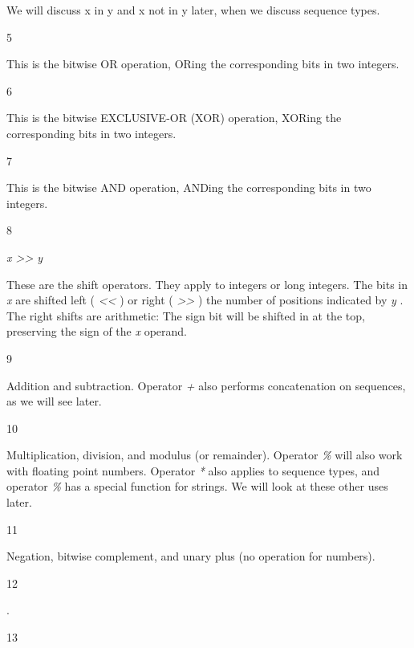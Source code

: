 We will discuss x in y and x not
in y later, when we discuss sequence types.

5



This is the bitwise OR operation,
ORing the corresponding bits in two integers.

6



This is the bitwise EXCLUSIVE-OR
(XOR) operation, XORing the corresponding bits in two integers.

7



This is the bitwise AND operation,
ANDing the corresponding bits in two integers.

8



 \emph{x
\textgreater{}\textgreater{} y}

These are the shift operators.
They apply to integers or long integers. The bits in \emph{x} are
shifted left ( \emph{\textless{}\textless{}} ) or right (
\emph{\textgreater{}\textgreater{}} ) the number of positions indicated
by \emph{y} . The right shifts are arithmetic: The sign bit will be
shifted in at the top, preserving the sign of the \emph{x} operand.

9





Addition and subtraction. Operator
\emph{+} also performs concatenation on sequences, as we will see later.

10







Multiplication, division, and
modulus (or remainder). Operator \emph{\%} will also work with floating
point numbers. Operator \emph{*} also applies to sequence types, and
operator \emph{\%} has a special function for strings. We will look at
these other uses later.

11







Negation, bitwise complement, and
unary plus (no operation for numbers).

12



 .

13









